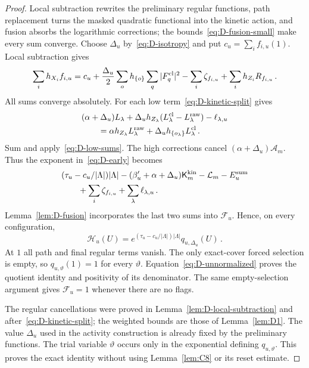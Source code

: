 \begin{proof}
Local subtraction rewrites the preliminary regular functions, path replacement turns the masked quadratic functional into the kinetic action, and fusion absorbs the logarithmic corrections; the bounds~\eqref{eq:D-fusion-small} make every sum converge. Choose $\Delta_u$ by~\eqref{eq:D-isotropy} and put $c_u=\sum_i f_{i,u}(1)$. Local subtraction gives
\begin{equation*}
\sum_i h_{X_i}f_{i,u}=c_u+\frac{\Delta_u}2\sum_o h_{\{o\}}\sum_q|F^{\rm cl}_q|^2
-\sum_i \zeta_{f_{i,u}}+\sum_i h_{Z_i}R_{f_{i,u}}\,.
\end{equation*}
All sums converge absolutely. For each low term~\eqref{eq:D-kinetic-split} gives
\begin{equation*}
\begin{aligned}
&(\alpha+\Delta_u)L_\lambda+\Delta_u h_{Z_\lambda}(L^{\rm cl}_\lambda-L^{\rm raw}_\lambda)-\ell_{\lambda,u}\\
&\qquad=\alpha h_{Z_\lambda}L^{\rm raw}_\lambda+\Delta_u h_{\{o_\lambda\}}L^{\rm cl}_\lambda\,.
\end{aligned}
\end{equation*}
Sum and apply~\eqref{eq:D-low-sums}. The high corrections cancel $(\alpha+\Delta_u)\mathcal A_m$. Thus the exponent in~\eqref{eq:D-early} becomes
\begin{equation*}
\begin{aligned}
&(\tau_u-c_u/|\Lambda|)|\Lambda|
-(\beta'_u+\alpha+\Delta_u)\mathsf K_m^{\rm kin}-\mathcal L_m-E_u^{\rm sum}\\
&\qquad+\sum_i \zeta_{f_{i,u}}+\sum_\lambda\ell_{\lambda,u}\,.
\end{aligned}
\end{equation*}
Lemma~\ref{lem:D-fusion} incorporates the last two sums into $\mathcal F_u$. Hence, on every configuration,
\begin{equation}\label{eq:D-unnormalized}
\mathcal H_u(U)=e^{(\tau_u-c_u/|\Lambda|)|\Lambda|}q_{u,\Delta_u}(U)\,.
\end{equation}
At $1$ all path and final regular terms vanish. The only exact-cover forced selection is empty, so $q_{u,\vartheta}(1)=1$ for every $\vartheta$. Equation~\eqref{eq:D-unnormalized} proves the quotient identity and positivity of its denominator. The same empty-selection argument gives $\mathcal F_u=1$ whenever there are no flags.

The regular cancellations were proved in Lemma~\ref{lem:D-local-subtraction} and after~\eqref{eq:D-kinetic-split}; the weighted bounds are those of Lemma~\ref{lem:D1}. The value $\Delta_u$ used in the activity construction is already fixed by the preliminary functions. The trial variable $\vartheta$ occurs only in the exponential defining $q_{u,\vartheta}$. This proves the exact identity without using Lemma~\ref{lem:C8} or its reset estimate.
\end{proof}

